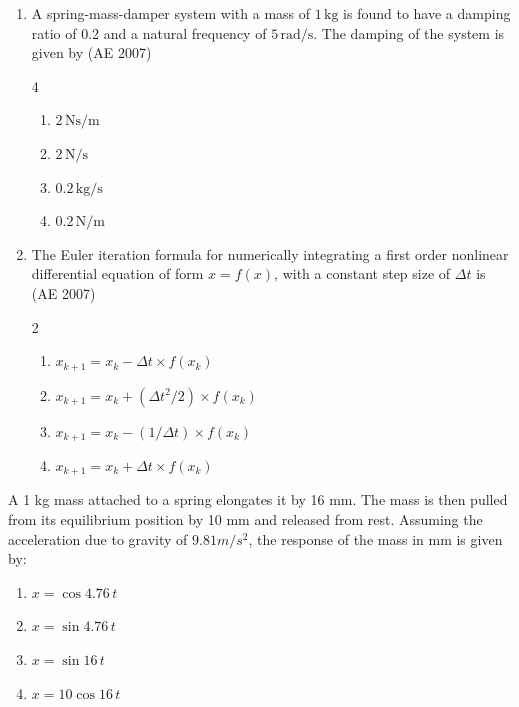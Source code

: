 \begin{enumerate}[label=\thesubsection.\arabic*,ref=\thesubsection.\theenumi]
    \item A spring-mass-damper system with a mass of $1 \, \mathrm{kg}$ is found to have a damping ratio of 0.2 and a natural frequency of $5 \, \mathrm{rad/s}$. The damping of the system is given by 
	    \hfill (AE 2007)
    \begin{multicols}{4}
    \begin{enumerate}
        \item $2 \, \mathrm{Ns/m}$ 
        \item $2 \, \mathrm{N/s}$ 
        \item $0.2 \, \mathrm{kg/s}$ 
        \item $0.2 \, \mathrm{N/m}$
    \end{enumerate}
    \end{multicols}
    \item The Euler iteration formula for numerically integrating a first order nonlinear differential equation of form $x = f(x)$, with a constant step size of $\Delta t$ is 
	    \hfill (AE 2007)
    \begin{multicols}{2}
    \begin{enumerate}
        \item $x_{k+1} = x_k - \Delta t \times f(x_k)$ 
        \item $x_{k+1} = x_k + \left( \Delta t^2 / 2 \right) \times f(x_k)$ 
        \item $x_{k+1} = x_k - (1 / \Delta t) \times f(x_k)$ 
        \item $x_{k+1} = x_k + \Delta t \times f(x_k)$
    \end{enumerate}
    \end{multicols}
\end{enumerate}
\iffalse
    \item A 1 kg mass attached to a spring elongates it by 16 mm. The mass is then pulled from its equilibrium position by 10 mm and released from rest. Assuming the acceleration due to gravity of $9.81 m/s^2$, the response of the mass in mm is given by: 
    \begin{enumerate}
        \item $x = \cos 4.76 \, t$
        \item $x = \sin 4.76 \, t$
        \item $x = \sin 16 \, t$
        \item $x = 10 \cos 16 \, t$ 
    \end{enumerate}
